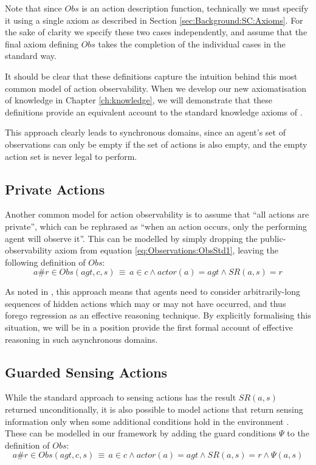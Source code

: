 Note that since $Obs$ is an action description function, technically
we must specify it using a single axiom as described in Section \ref{sec:Background:SC:Axioms}.
For the sake of clarity we specify these two cases independently,
and assume that the final axiom defining $Obs$ takes the completion
of the individual cases in the standard way.

It should be clear that these definitions capture the intuition behind
this most common model of action observability. When we develop our
new axiomatisation of knowledge in Chapter \ref{ch:knowledge}, we
will demonstrate that these definitions provide an equivalent account
to the standard knowledge axioms of \citet{scherl03sc_knowledge}.

This approach clearly leads to synchronous domains, since an agent's
set of observations can only be empty if the set of actions is also
empty, and the empty action set is never legal to perform.


\subsection{Private Actions}

Another common model for action observability is to assume that {}``all
actions are private'', which can be rephrased as {}``when an action
occurs, only the performing agent will observe it''. This can be
modelled by simply dropping the public-observability axiom from equation
\ref{eq:Observations:ObsStd1}, leaving the following definition of
$Obs$:\[
a\#r\in Obs(agt,c,s)\,\equiv\, a\in c\wedge actor(a)=agt\wedge SR(a,s)=r\]


As noted in \citep{Lesperance99sitcalc_approach}, this approach means
that agents need to consider arbitrarily-long sequences of hidden
actions which may or may not have occurred, and thus forego regression
as an effective reasoning technique. By explicitly formalising this
situation, we will be in a position provide the first formal account
of effective reasoning in such asynchronous domains.


\subsection{Guarded Sensing Actions\label{sec:Observations:Guarded-Sensing}}

While the standard approach to sensing actions has the result $SR(a,s)$
returned unconditionally, it is also possible to model actions that
return sensing information only when some additional conditions hold
in the environment \citep{Petrick06thesis}. These can be modelled
in our framework by adding the guard conditions $\Psi$ to the definition
of $Obs$:\[
a\#r\in Obs(agt,c,s)\,\equiv\, a\in c\wedge actor(a)=agt\wedge SR(a,s)=r\wedge\Psi(a,s)\]


